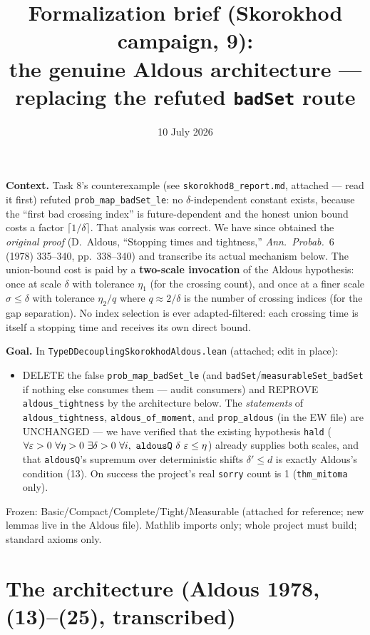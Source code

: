 \documentclass[11pt]{article}
\title{Formalization brief (Skorokhod campaign, 9):\\
the genuine Aldous architecture --- replacing the refuted \texttt{badSet} route}
\date{10 July 2026}
\theoremstyle{plain}
\theoremstyle{remark}
\begin{document}
\maketitle

\noindent\textbf{Context.} Task 8's counterexample (see
\texttt{skorokhod8\_report.md}, attached --- read it first) refuted
\texttt{prob\_map\_badSet\_le}: no $\delta$-independent constant exists,
because the ``first bad crossing index'' is future-dependent and the honest
union bound costs a factor $\lceil 1/\delta\rceil$. That analysis was
correct. We have since obtained the \emph{original proof} (D.~Aldous,
``Stopping times and tightness,'' \emph{Ann.\ Probab.}~6 (1978) 335--340,
pp.~338--340) and transcribe its actual mechanism below. The union-bound
cost is paid by a \textbf{two-scale invocation} of the Aldous hypothesis:
once at scale $\delta$ with tolerance $\eta_1$ (for the crossing count), and
once at a finer scale $\sigma\le\delta$ with tolerance $\eta_2/q$ where
$q\approx 2/\delta$ is the number of crossing indices (for the gap
separation). No index selection is ever adapted-filtered: each crossing time
is itself a stopping time and receives its own direct bound.

\medskip
\noindent\textbf{Goal.} In \texttt{TypeDDecouplingSkorokhodAldous.lean}
(attached; edit in place):
\begin{itemize}
\item DELETE the false \texttt{prob\_map\_badSet\_le} (and
\texttt{badSet}/\texttt{measurableSet\_badSet} if nothing else consumes
them --- audit consumers) and REPROVE \texttt{aldous\_tightness} by the
architecture below. The \emph{statements} of \texttt{aldous\_tightness},
\texttt{aldous\_of\_moment}, and \texttt{prop\_aldous} (in the EW file) are
UNCHANGED --- we have verified that the existing hypothesis
\texttt{hald} ($\forall\eps>0\ \forall\eta>0\ \exists\delta>0\ \forall i,\
\texttt{aldousQ}\ \delta\ \eps\le\eta$) already supplies both scales, and
that \texttt{aldousQ}'s supremum over deterministic shifts $\delta'\le d$
is exactly Aldous's condition (13). On success the project's real
\texttt{sorry} count is 1 (\texttt{thm\_mitoma} only).
\end{itemize}
Frozen: Basic/Compact/Complete/Tight/Measurable (attached for reference;
new lemmas live in the Aldous file). Mathlib imports only; whole project
must build; standard axioms only.

\section*{The architecture (Aldous 1978, (13)--(25), transcribed)}
\end{document}
